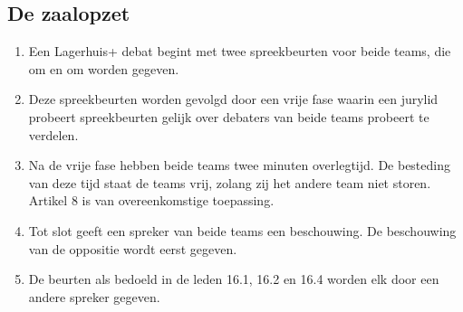 \subsection{De zaalopzet }

\begin{enumerate}
\item Een Lagerhuis+ debat begint met twee spreekbeurten voor beide teams, die om en om worden gegeven.
\item Deze spreekbeurten worden gevolgd door een vrije fase waarin een jurylid probeert spreekbeurten gelijk over debaters van beide teams probeert te verdelen.
\item Na de vrije fase hebben beide teams twee minuten overlegtijd. De besteding van deze tijd staat de teams vrij, zolang zij het andere team niet storen. Artikel 8 is van overeenkomstige toepassing.
\item Tot slot geeft een spreker van beide teams een beschouwing. De beschouwing van de oppositie wordt eerst gegeven.
\item De beurten als bedoeld in de leden 16.1, 16.2 en 16.4 worden elk door een andere spreker gegeven.
\end{enumerate}
